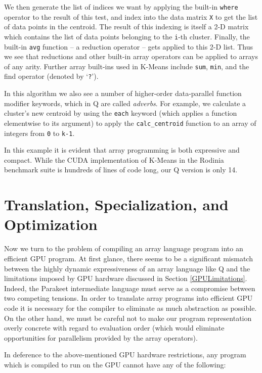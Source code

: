 \documentclass[preprint]{sigplanconf}
\begin{document}
We then generate the list of indices we want by applying the built-in \texttt{where} operator to the result of this test, and index into the data matrix \texttt{X} to get the list of data points in the centroid. The result of this indexing is itself a 2-D matrix which contains the list of data points belonging to the \texttt{i}-th cluster. Finally, the built-in \texttt{avg} function -- a reduction operator -- gets applied to this 2-D list. Thus we see that reductions and other built-in array operators can be applied to arrays of any arity.  Further array built-ins used in K-Means include \texttt{sum}, \texttt{min}, and the find operator (denoted by `\texttt{?}').

In this algorithm we also see a number of higher-order data-parallel function modifier keywords, which in Q are called \emph{adverbs}.  For example, we calculate a cluster's new centroid by using the \texttt{each} keyword (which applies a function elementwise to its argument) to apply the \texttt{calc\_centroid} function to an array of integers from \texttt{0} to \texttt{k-1}.

In this example it is evident that array programming is both expressive and compact.  While the CUDA implementation of K-Means in the Rodinia benchmark suite is hundreds of lines of code long, our Q version is only 14. 

\section{Translation, Specialization, and Optimization}
\label{Compilation}
Now we turn to the problem of compiling an array language program into an efficient GPU program. At first glance, there seems to be a significant mismatch between the highly dynamic expressiveness of an array language like Q and the limitations imposed by GPU hardware discussed in Section \ref{GPULimitations}. Indeed, the Parakeet intermediate language must serve as a compromise between two competing tensions. In order to translate array programs into efficient GPU code it is necessary for the compiler to eliminate as much abstraction as possible. On the other hand, we must be careful not to make our program representation overly concrete with regard to evaluation order (which would eliminate opportunities for parallelism provided by the array operators). 

In deference to the above-mentioned GPU hardware restrictions, any program which is compiled to run on the GPU cannot have any of the following:
\end{document}
